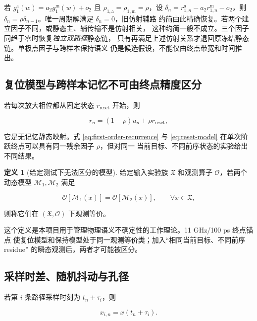 \documentclass[11pt,a4paper]{ctexart}
\theoremstyle{adcplain}
\theoremstyle{definition}
\newtheorem{definition}[proposition]{定义}
\begin{document}
若 $g_1^{\mathrm a}(w)=a_2g_1^{\mathrm m}(w)+o_2$ 且
$\rho_{1,\mathrm a}=\rho_{1,\mathrm m}=\rho$，设
$\delta_n=r_{1,n}^{\mathrm a}-a_2r_{1,n}^{\mathrm m}-o_2$，则
$\delta_n=\rho\delta_{n-1}$。唯一周期解满足 $\delta_n=0$，旧仿射辅路
约简由此精确恢复。若两个建立因子不同，或静态主、辅传输不是仿射相关，
这种约简一般不成立。三个因子同趋于零时恢复\emph{独立双路径}静态链，
只有再满足上述仿射关系才退回原冻结静态链。单极点因子与跨样本保持语义
仍是候选假设，不能仅由终点带宽和时间推出。

\subsection{复位模型与跨样本记忆不可由终点精度区分}

若每次放大相位都从固定状态 $r_{\mathrm{reset}}$ 开始，则

\begin{equation}
  r_n
  =
  (1-\rho)u_n+\rho r_{\mathrm{reset}},
  \label{eq:reset-model}
\end{equation}

它是无记忆静态映射。式 \eqref{eq:first-order-recurrence} 与
\eqref{eq:reset-model} 在单次阶跃终点可以具有同一残余因子 $\rho$，但对同一
当前目标、不同前序状态的实验给出不同结果。

\begin{definition}[给定测试下无法区分的模型]
给定输入实验族 $\mathfrak X$ 和观测算子 $\mathcal O$，若两个动态模型
$\mathcal M_1,\mathcal M_2$ 满足

\begin{equation}
  \mathcal O[\mathcal M_1(x)]
  =
  \mathcal O[\mathcal M_2(x)],
  \qquad \forall x\in\mathfrak X,
\end{equation}

则称它们在 $(\mathfrak X,\mathcal O)$ 下观测等价。
\end{definition}

这个定义是本项目用于管理物理语义不确定性的工作理论。11 GHz/100 ps 终点锚点
使复位模型和保持模型处于同一观测等价类；加入“相同当前目标、不同前序 residue”
的瞬态观测后，两者才可能被区分。

\subsection{采样时差、随机抖动与孔径}

若第 $i$ 条路径采样时刻为 $t_n+\tau_i$，则

\begin{equation}
  x_{i,n}=x(t_n+\tau_i).
\end{equation}
\end{document}
